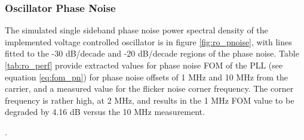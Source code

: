 	\subsubsection{Oscillator Phase Noise}
	The simulated single sideband phase noise power spectral density of the implemented voltage controlled oscillator is in figure \ref{fig:ro_pnoise}, with lines fitted to the -30 dB/decade and -20 dB/decade regions of the phase noise. Table \ref{tab:ro_perf} provide extracted values for phase noise FOM of the PLL (see equation \ref{eq:fom_pn}) for phase noise offsets of 1 MHz and 10 MHz from the carrier, and a measured value for the flicker noise corner frequency. The corner frequency is rather high, at 2 MHz, and results in the 1 MHz FOM value to be degraded by 4.16 dB versus the 10 MHz measurement.
		\begin{figure}[htb!]
			\begin{floatrow}
			\end{floatrow}
		\end{figure}	
		{\color{white}.}


